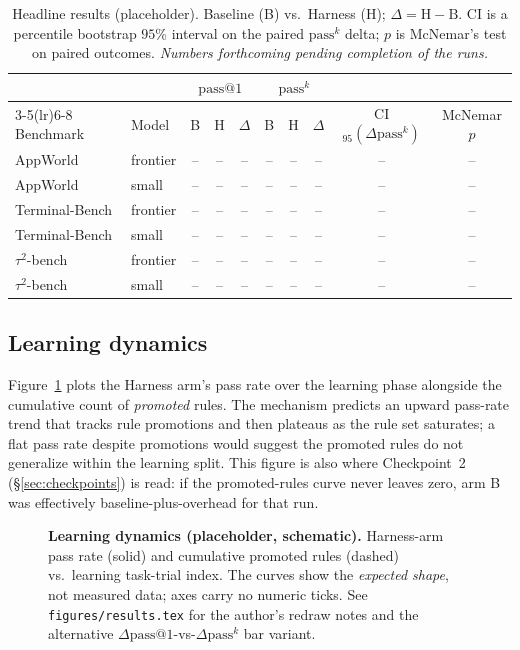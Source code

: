 \documentclass[letterpaper]{article} %
\makeatletter
\newcommand{\passk}{\mathrm{pass}^{k}}
\newcommand{\passone}{\mathrm{pass@}1}
\newcommand{\TBD}{--}                             %
\makeatother
\begin{document}
\begin{table}[t]
\centering\small
\caption{Headline results (placeholder). Baseline (B) vs.\ Harness (H); $\Delta = \mathrm{H}-\mathrm{B}$.
CI is a percentile bootstrap $95\%$ interval on the paired $\passk$ delta; $p$ is McNemar's test on
paired outcomes. \emph{Numbers forthcoming pending completion of the runs.}}
\label{tab:headline}
\begin{tabular}{@{}llcccccccc@{}}
\toprule
& & \multicolumn{3}{c}{$\passone$} & \multicolumn{3}{c}{$\passk$} & & \\
\cmidrule(lr){3-5}\cmidrule(lr){6-8}
Benchmark & Model & B & H & $\Delta$ & B & H & $\Delta$ & CI$_{95}(\Delta\passk)$ & McNemar $p$ \\
\midrule
AppWorld       & frontier & \TBD & \TBD & \TBD & \TBD & \TBD & \TBD & \TBD & \TBD \\
AppWorld       & small    & \TBD & \TBD & \TBD & \TBD & \TBD & \TBD & \TBD & \TBD \\
Terminal-Bench & frontier & \TBD & \TBD & \TBD & \TBD & \TBD & \TBD & \TBD & \TBD \\
Terminal-Bench & small    & \TBD & \TBD & \TBD & \TBD & \TBD & \TBD & \TBD & \TBD \\
$\tau^2$-bench & frontier & \TBD & \TBD & \TBD & \TBD & \TBD & \TBD & \TBD & \TBD \\
$\tau^2$-bench & small    & \TBD & \TBD & \TBD & \TBD & \TBD & \TBD & \TBD & \TBD \\
\bottomrule
\end{tabular}
\end{table}

\subsection{Learning dynamics}
\label{sec:learning}
Figure~\ref{fig:results} plots the Harness arm's pass rate over the learning phase alongside
the cumulative count of \emph{promoted} rules. The mechanism predicts an upward pass-rate trend
that tracks rule promotions and then plateaus as the rule set saturates; a flat pass rate
despite promotions would suggest the promoted rules do not generalize within the learning
split. This figure is also where Checkpoint~2 (\S\ref{sec:checkpoints}) is read: if the
promoted-rules curve never leaves zero, arm B was effectively baseline-plus-overhead for that
run.

\begin{figure}[t]
\centering
\resizebox{\columnwidth}{!}{}
\caption{\textbf{Learning dynamics (placeholder, schematic).} Harness-arm pass rate (solid) and
cumulative promoted rules (dashed) vs.\ learning task-trial index. The curves show the
\emph{expected shape}, not measured data; axes carry no numeric ticks. See
\texttt{figures/results.tex} for the author's redraw notes and the alternative
$\Delta\passone$-vs-$\Delta\passk$ bar variant.}
\label{fig:results}
\end{figure}
\end{document}
